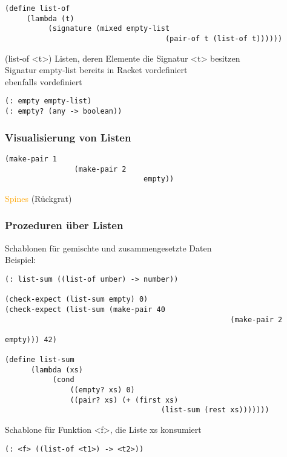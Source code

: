 \documentclass[paper=a4, fontsize=11pt]{scrartcl}
\numberwithin{equation}{section}
\numberwithin{figure}{section}
\numberwithin{table}{section}
\begin{document}
\begin{lstlistig}
\begin{lstlisting}
(define list-of
     (lambda (t)
          (signature (mixed empty-list
                                     (pair-of t (list-of t))))))
\end{lstlisting}

(list-of <t>) Listen, deren Elemente die Signatur <t> besitzen \\
Signatur empty-list bereits in Racket vordefiniert \\
ebenfalls vordefiniert
\begin{lstlisting}
(: empty empty-list)
(: empty? (any -> boolean))
\end{lstlisting}
\subsubsection{Visualisierung von Listen}
\begin{lstlisting}
(make-pair 1
                (make-pair 2
                                empty))
\end{lstlisting}


\textcolor{orange}{Spines} (Rückgrat)
\subsubsection{Prozeduren über Listen}
Schablonen für gemischte und zusammengesetzte Daten \\
Beispiel:
\begin{lstlisting}
(: list-sum ((list-of umber) -> number))

(check-expect (list-sum empty) 0)
(check-expect (list-sum (make-pair 40
                                                    (make-pair 2
                                                                    empty))) 42)
                                                                    
(define list-sum
      (lambda (xs)
           (cond
               ((empty? xs) 0)
               ((pair? xs) (+ (first xs)
                                    (list-sum (rest xs)))))))                                                                    
\end{lstlisting}

Schablone für Funktion <f>, die Liste xs konsumiert
\begin{lstlisting}
(: <f> ((list-of <t1>) -> <t2>))


\end{lstlisting}
\end{lstlistig}
\end{document}
